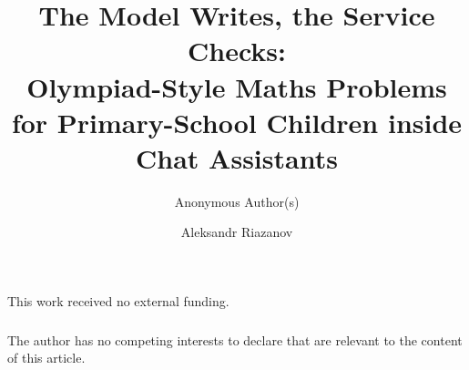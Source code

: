 \documentclass[runningheads]{llncs}
\begin{document}
\title{The Model Writes, the Service Checks:\\
Olympiad-Style Maths Problems for Primary-School Children inside Chat Assistants}

\ifanonymous
  \author{Anonymous Author(s)}
\else
  \author{Aleksandr Riazanov}
\fi

\maketitle
\VersionFootnote











\ifanonymous\else
\begin{credits}
\subsubsection{\ackname} This work received no external funding.
\subsubsection{\discintname} The author has no competing interests to declare that are relevant to the content of this article.
\end{credits}
\fi



\end{document}
